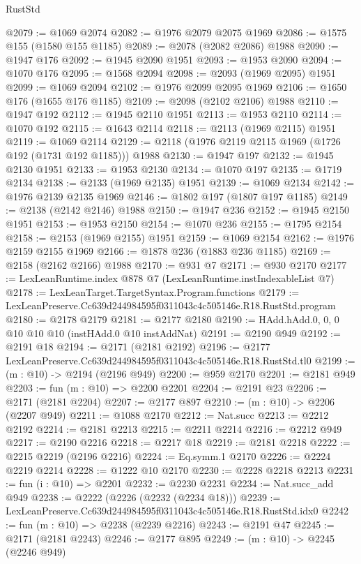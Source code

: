 \begin{lexlean}{RustStd}
\begin{coremodule}
@2079 := @1069 @2074
@2082 := @1976 @2079 @2075 @1969
@2086 := @1575 @155 (@1580 @155 @1185)
@2089 := @2078 (@2082 @2086) @1988
@2090 := @1947 @176
@2092 := @1945 @2090 @1951
@2093 := @1953 @2090
@2094 := @1070 @176
@2095 := @1568 @2094
@2098 := @2093 (@1969 @2095) @1951
@2099 := @1069 @2094
@2102 := @1976 @2099 @2095 @1969
@2106 := @1650 @176 (@1655 @176 @1185)
@2109 := @2098 (@2102 @2106) @1988
@2110 := @1947 @192
@2112 := @1945 @2110 @1951
@2113 := @1953 @2110
@2114 := @1070 @192
@2115 := @1643 @2114
@2118 := @2113 (@1969 @2115) @1951
@2119 := @1069 @2114
@2129 := @2118 (@1976 @2119 @2115 @1969 (@1726 @192 (@1731 @192 @1185))) @1988
@2130 := @1947 @197
@2132 := @1945 @2130 @1951
@2133 := @1953 @2130
@2134 := @1070 @197
@2135 := @1719 @2134
@2138 := @2133 (@1969 @2135) @1951
@2139 := @1069 @2134
@2142 := @1976 @2139 @2135 @1969
@2146 := @1802 @197 (@1807 @197 @1185)
@2149 := @2138 (@2142 @2146) @1988
@2150 := @1947 @236
@2152 := @1945 @2150 @1951
@2153 := @1953 @2150
@2154 := @1070 @236
@2155 := @1795 @2154
@2158 := @2153 (@1969 @2155) @1951
@2159 := @1069 @2154
@2162 := @1976 @2159 @2155 @1969
@2166 := @1878 @236 (@1883 @236 @1185)
@2169 := @2158 (@2162 @2166) @1988
@2170 := @931 @7
@2171 := @930 @2170
@2177 := LexLeanRuntime.index @878 @7 (LexLeanRuntime.instIndexableList @7)
@2178 := LexLeanTarget.TargetSyntax.Program.functions
@2179 := LexLeanPreserve.Cc639d244984595f0311043c4c505146e.R18.RustStd.program
@2180 := @2178 @2179
@2181 := @2177 @2180
@2190 := HAdd.hAdd.{0, 0, 0} @10 @10 @10 (instHAdd.{0} @10 instAddNat)
@2191 := @2190 @949
@2192 := @2191 @18
@2194 := @2171 (@2181 @2192)
@2196 := @2177 LexLeanPreserve.Cc639d244984595f0311043c4c505146e.R18.RustStd.tl0
@2199 := (m : @10) -> @2194 (@2196 @949)
@2200 := @959 @2170
@2201 := @2181 @949
@2203 := fun (m : @10) => @2200 @2201
@2204 := @2191 @23
@2206 := @2171 (@2181 @2204)
@2207 := @2177 @897
@2210 := (m : @10) -> @2206 (@2207 @949)
@2211 := @1088 @2170
@2212 := Nat.succ
@2213 := @2212 @2192
@2214 := @2181 @2213
@2215 := @2211 @2214
@2216 := @2212 @949
@2217 := @2190 @2216
@2218 := @2217 @18
@2219 := @2181 @2218
@2222 := @2215 @2219 (@2196 @2216)
@2224 := Eq.symm.{1} @2170
@2226 := @2224 @2219 @2214
@2228 := @1222 @10 @2170
@2230 := @2228 @2218 @2213
@2231 := fun (i : @10) => @2201
@2232 := @2230 @2231
@2234 := Nat.succ_add @949
@2238 := @2222 (@2226 (@2232 (@2234 @18)))
@2239 := LexLeanPreserve.Cc639d244984595f0311043c4c505146e.R18.RustStd.idx0
@2242 := fun (m : @10) => @2238 (@2239 @2216)
@2243 := @2191 @47
@2245 := @2171 (@2181 @2243)
@2246 := @2177 @895
@2249 := (m : @10) -> @2245 (@2246 @949)

\end{coremodule}
\end{lexlean}
